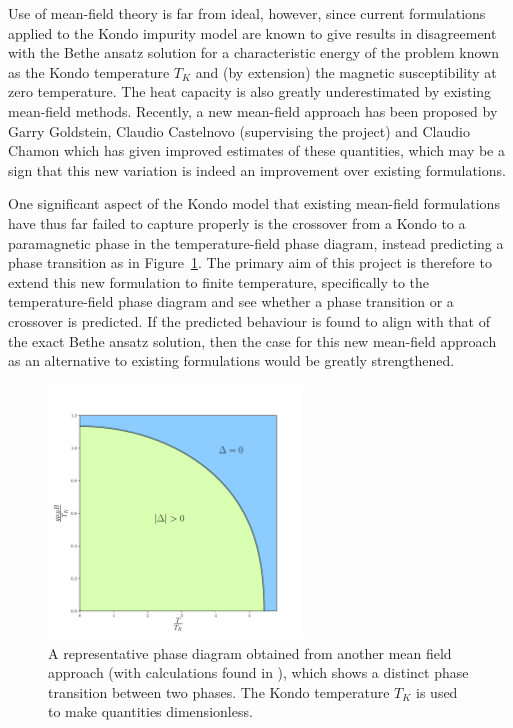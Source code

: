 \documentclass[12pt]{article}
\begin{document}
Use of mean-field theory is far from ideal, however, since current formulations applied to the Kondo impurity model are known to give results in disagreement with the Bethe ansatz solution for a characteristic energy of the problem known as the Kondo temperature $ T_{K} $ and (by extension) the magnetic susceptibility at zero temperature. The heat capacity is also greatly underestimated by existing mean-field methods. Recently, a new mean-field approach has been proposed by Garry Goldstein, Claudio Castelnovo (supervising the project) and Claudio Chamon which has given improved estimates of these quantities, which may be a sign that this new variation is indeed an improvement over existing formulations.

One significant aspect of the Kondo model that existing mean-field formulations have thus far failed to capture properly is the crossover from a Kondo to a paramagnetic phase in the temperature-field phase diagram, instead predicting a phase transition as in Figure~\ref{fig:phase_diagram}. The primary aim of this project is therefore to extend this new formulation to finite temperature, specifically to the temperature-field phase diagram and see whether a phase transition or a crossover is predicted. If the predicted behaviour is found to align with that of the exact Bethe ansatz solution, then the case for this new mean-field approach as an alternative to existing formulations would be greatly strengthened.

\begin{figure}[ht]
  \centering
  \includegraphics[width=0.6\textwidth]{phase_diagram.pdf}
  \caption{A representative phase diagram obtained from another mean field approach (with calculations found in \cite{ManyBodyPhysics}), which shows a distinct phase transition between two phases. The Kondo temperature $ T_K $ is used to make quantities dimensionless.}
  \label{fig:phase_diagram}
\end{figure}
\end{document}
